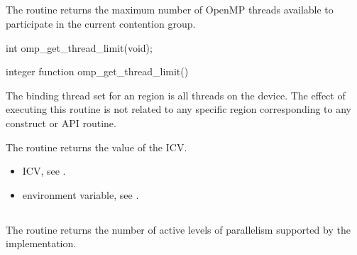 \subsection{}
\label{subsec:omp_get_thread_limit}
\summary
The  routine returns the maximum number of OpenMP
threads available to participate in the current contention group.


\format
\begin{ccppspecific}
\begin{ompcFunction}
int omp_get_thread_limit(void);
\end{ompcFunction}
\end{ccppspecific}

\begin{fortranspecific}
\begin{ompfFunction}
integer function omp_get_thread_limit()
\end{ompfFunction}
\end{fortranspecific}

\binding
The binding thread set for an  region is all threads on the
device. The effect of executing this routine is not related to any specific region
corresponding to any construct or API routine.

\effect
The  routine returns the value of the  ICV.

\crossreferences
\begin{itemize}
\item {} ICV, see
.

\item {} environment variable, see
.
\end{itemize}








\subsection{}
\label{subsec:omp_get_supported_active_levels}

\summary
The  routine returns the
number of active levels of parallelism supported by the implementation.


